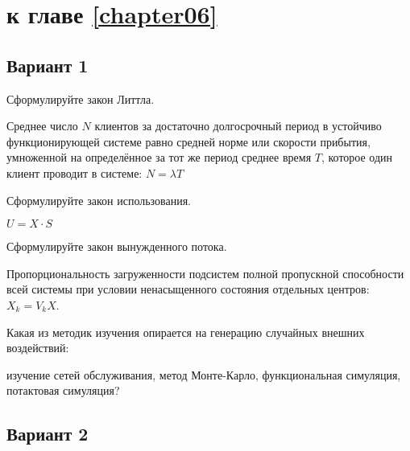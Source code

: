 \section{\Questions к главе \ref{chapter06}} %

\subsection*{Вариант 1}

\begin{questions}

\question[3] Сформулируйте закон Литтла.
\begin{solution}[2cm]
Среднее число $N$ клиентов за достаточно долгосрочный период в устойчиво функционирующей системе  равно средней норме или скорости прибытия, умноженной на определённое за тот же период среднее время $T$, которое один клиент проводит в системе: $N = \lambda T$
\end{solution}

\question[3] Сформулируйте закон использования.
\begin{solution}[2cm]
$U = X \cdot S $
\end{solution}

\question[3] Сформулируйте закон вынужденного потока.
\begin{solution}[2cm]
Пропорциональность загруженности подсистем полной пропускной способности всей системы при условии ненасыщенного состояния отдельных центров: $X_k = V_k X$.
\end{solution}

\question[3] Какая из методик изучения опирается на генерацию случайных внешних воздействий:
\begin{choices}
\choice изучение сетей обслуживания,
\correctchoice метод Монте-Карло,
\choice функциональная симуляция,
\choice потактовая симуляция?
\end{choices}


\end{questions}

\subsection*{Вариант 2}

